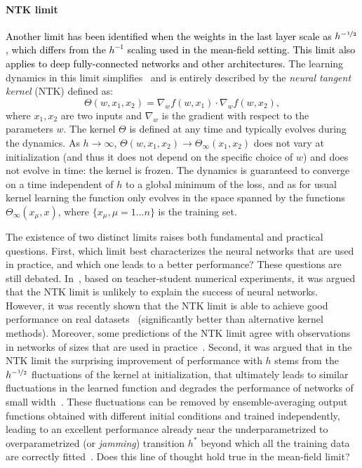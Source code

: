 \documentclass{article}
\newcommand{\mm}[1]{\textcolor{black}{#1}}
\renewcommand{\cite}[1]{\citep{#1}}
\begin{document}
\paragraph{NTK limit}
\mm{Another limit has been \mm{identified} when the weights in the last layer scale as $h^{-\nicefrac12}$, which differs from the $h^{-1}$ scaling used in the mean-field setting. This limit also applies to deep fully-connected networks and other architectures.}
The learning dynamics in this limit simplifies~\cite{jacot2018neural,Du2019,Allen-Zhu2018,lee2019wide,arora2019exact,park2019effect} and is entirely described by the \emph{neural tangent kernel} (NTK) defined as:
\begin{equation}
\Theta(w,x_1,x_2) = \nabla_w f(w,x_1) \cdot \nabla_w f(w,x_2),\label{eq:ntkformula}
\end{equation}
where $x_1,x_2$ are two inputs and  $\nabla_w$ is the gradient with respect to the parameters $w$. The kernel $\Theta$ is defined at any time and typically evolves during the dynamics. As $h\to\infty$, $\Theta(w,x_1,x_2)\to\Theta_\infty(x_1,x_2)$ does not vary at initialization (and thus it does not depend on the specific choice of $w$) and does not evolve in time: the kernel is frozen. The dynamics is guaranteed to converge on a time independent of $h$ to a global minimum of the loss, and as for usual kernel learning the function only evolves in the space spanned by the functions $\Theta_\infty(x_\mu,x)$, where $\{x_\mu, \mu=1...n\}$ is the training set.\vspace{1em}

The existence of two distinct limits raises both fundamental and practical questions. First, which limit best characterizes the neural networks that are used in practice, and which one leads to a better performance? These questions are still debated. In~\cite{chizat19}, based on teacher-student numerical experiments, it was argued that the NTK limit is unlikely to explain the success of neural networks. However, it was recently shown that the NTK limit is able to achieve good performance on real datasets~\cite{arora2019exact} (significantly better than alternative  kernel methods). Moreover, some predictions of the NTK limit agree with observations in networks of sizes that are used in practice~\cite{lee2019wide}. Second, it was argued that in the NTK limit the surprising improvement of performance with $h$ stems from the $h^{-\nicefrac12}$ fluctuations of the kernel at initialization, that ultimately leads to similar fluctuations in the learned function and degrades the performance of networks of small width~\cite{geiger2019scaling}. These fluctuations can be removed by ensemble-averaging output functions obtained with different initial conditions and trained independently, leading to an excellent performance already near the underparametrized to overparametrized (or \emph{jamming}) transition $h^*$ beyond which all the training data are correctly fitted~\cite{Geiger18}. Does this line of thought hold true in the mean-field limit?  
\end{document}
